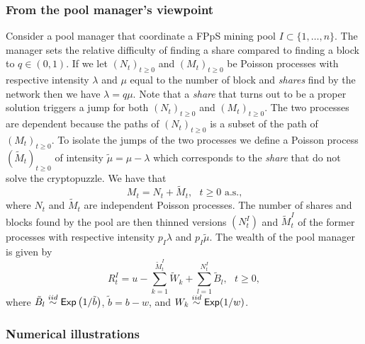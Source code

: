 \subsubsection{From the pool manager's viewpoint}\label{ssec:manager_viewpoint}
Consider a pool manager that coordinate a FPpS mining pool $I\subset\{1,\ldots, n\}$. The manager sets the relative difficulty of finding a share compared to finding a block to $q\in(0,1)$. If we let $(N_t)_{t\geq0}$ and $(M_t)_{t\geq0}$ be Poisson processes with respective intensity $\lambda$ and $\mu$ equal to the number of block and \textit{shares} find by the network then we have $\lambda = q\mu$. Note that a \textit{share} that turns out to be a proper solution triggers a jump for both $(N_t)_{t\geq0}$ and $(M_t)_{t\geq0}$. The two processes are dependent because the paths of $(N_t)_{t\geq0}$ is a subset of the path of $(M_t)_{t\geq0}$. To isolate the jumps of the two processes we define a Poisson process $(\tilde{M}_t)_{t\geq0}$ of intensity $\tilde{\mu} = \mu -\lambda$ which corresponds to the \textit{share} that do not solve the cryptopuzzle. We have that 
\[
M_t = N_t+\tilde{M}_t,\text{ }t\geq0\text{ a.s.,}
\] 
where $N_t$ and $\tilde{M}_t$ are independent Poisson processes. The number of shares and blocks found by the pool are then thinned versions $(N_t^I)$ and $\tilde{M}_t^{I}$ of the former processes with respective intensity $p_I\lambda$ and $p_I\tilde{\mu}$. The wealth of the pool manager is given by 
\begin{equation}\label{eq:wealth_pool_manager_fpps}
R^I_t = u - \sum_{k = 1}^{\tilde{M}^I_t}\tilde{W}_k + \sum_{l = 1}^{N_t^I}\tilde{B}_l,\text{ }t\geq0, 
\end{equation}
where $\tilde{B}_l\overset{iid}{\sim}\mathsf{Exp}\left(1/\tilde{b}\right)$, $\tilde{b} = b-w$, and $W_k\overset{iid}{\sim}\mathsf{Exp}(1/w)$.

\subsubsection{Numerical illustrations}\label{ssec:numerical_illustrations}

\newpage